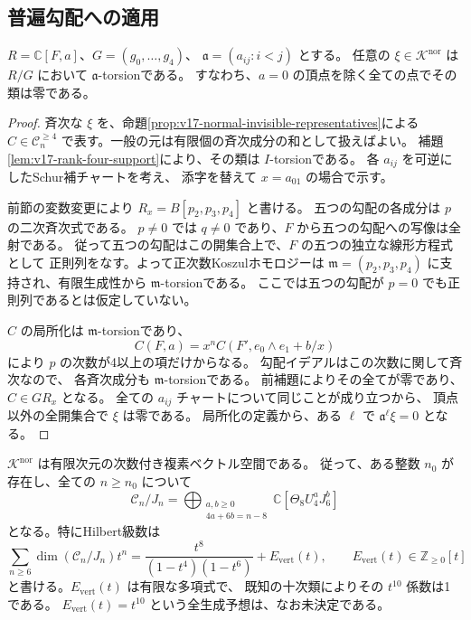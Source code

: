\subsection{普遍勾配への適用}

\begin{theorem}[横断射影の核は頂点に支持される]
\label{thm:v17-normal-kernel-vertex-support}
$R=\mathbb C[F,a]$、$G=(g_0,\ldots,g_4)$、
$\mathfrak a=(a_{ij}:i<j)$ とする。
任意の $\xi\in\mathcal K^{\mathrm{nor}}$ は $R/G$ において
$\mathfrak a$-torsionである。
すなわち、$a=0$ の頂点を除く全ての点でその類は零である。
\end{theorem}

\begin{proof}
斉次な $\xi$ を、命題\ref{prop:v17-normal-invisible-representatives}による
$C\in\mathcal C_n^{\ge4}$ で表す。一般の元は有限個の斉次成分の和として扱えばよい。
補題\ref{lem:v17-rank-four-support}により、その類は $I$-torsionである。
各 $a_{ij}$ を可逆にしたSchur補チャートを考え、
添字を替えて $x=a_{01}$ の場合で示す。

前節の変数変更により $R_x=B[p_2,p_3,p_4]$ と書ける。
五つの勾配の各成分は $p$ の二次斉次式である。
$p\ne0$ では $q\ne0$ であり、$F$ から五つの勾配への写像は全射である。
従って五つの勾配はこの開集合上で、$F$ の五つの独立な線形方程式として
正則列をなす。よって正次数Koszulホモロジーは
$\mathfrak m=(p_2,p_3,p_4)$ に支持され、有限生成性から
$\mathfrak m$-torsionである。
ここでは五つの勾配が $p=0$ でも正則列であるとは仮定していない。

$C$ の局所化は $\mathfrak m$-torsionであり、
\[
 C(F,a)=x^nC(F',e_0\wedge e_1+b/x)
\]
により $p$ の次数が4以上の項だけからなる。
勾配イデアルはこの次数に関して斉次なので、
各斉次成分も $\mathfrak m$-torsionである。
前補題によりその全てが零であり、$C\in GR_x$ となる。
全ての $a_{ij}$ チャートについて同じことが成り立つから、
頂点以外の全開集合で $\xi$ は零である。
局所化の定義から、ある $\ell$ で $\mathfrak a^\ell\xi=0$ となる。
\end{proof}

\begin{theorem}[未知部分の有限次元性と十分高い次数の通常商]
\label{thm:v17-finite-normal-kernel}
$\mathcal K^{\mathrm{nor}}$ は有限次元の次数付き複素ベクトル空間である。
従って、ある整数 $n_0$ が存在し、全ての $n\ge n_0$ について
\begin{equation}\label{eq:v17-eventual-contact-quotient}
 \mathcal C_n/J_n
  =\bigoplus_{\substack{a,b\ge0\\4a+6b=n-8}}
      \mathbb C[\Theta_8U_4^aJ_6^b]
\end{equation}
となる。特にHilbert級数は
\begin{equation}\label{eq:v17-contact-hilbert-finite-correction}
 \sum_{n\ge6}\dim(\mathcal C_n/J_n)t^n
   =\frac{t^8}{(1-t^4)(1-t^6)}+E_{\mathrm{vert}}(t),
 \qquad E_{\mathrm{vert}}(t)\in\mathbb Z_{\ge0}[t]
\end{equation}
と書ける。$E_{\mathrm{vert}}(t)$ は有限な多項式で、
既知の十次類によりその $t^{10}$ 係数は1である。
$E_{\mathrm{vert}}(t)=t^{10}$ という全生成予想は、なお未決定である。
\end{theorem}

